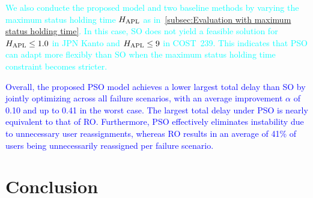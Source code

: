 \documentclass[10pt, letterpaper]{IEEEtran}
\newcommand\blue[1]{\textcolor{blue}{#1}}
\newcommand\cyan[1]{\textcolor{cyan}{#1}}
\begin{document}
\begin{CJK}{UTF8}{ipxm}
\cyan{
We also conducte the proposed model and two baseline methods by varying the maximum status holding time $H_{\rm APL}$ as in~\ref{subsec:Evaluation with maximum status holding time}.
In this case, SO does not yield a feasible solution for $H_{\rm APL} \leq 1.0$ in JPN Kanto and $H_{\rm APL} \leq 9$ in COST~239.
This indicates that PSO can adapt more flexibly than SO when the maximum status holding time constraint becomes stricter.
}

\blue{
Overall, the proposed PSO model achieves a lower largest total delay than SO by jointly optimizing across all failure scenarios, with an average improvement $\alpha$ of 0.10 and up to 0.41 in the worst case.
The largest total delay under PSO is nearly equivalent to that of RO.
Furthermore, PSO effectively eliminates instability due to unnecessary user reassignments, whereas RO results in an average of 41\% of users being unnecessarily reassigned per failure scenario.
}

\section{Conclusion}
\label{sec:conclusion}



\end{CJK}
\end{document}
